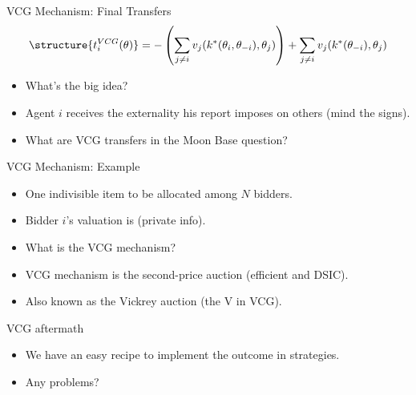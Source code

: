 \documentclass[english,10pt
,aspectratio=169
]{beamer}
\begin{document}
\begin{frame}{VCG Mechanism: Final Transfers}
\begin{align*}
\structure{ t_{i}^{VCG}(\theta) } = -\left(\sum_{j\neq i} v_{j}(k^*(\theta_i, \theta_{-i}), \theta_{j}) \right) + \sum_{j\neq i} v_{j}(k^*(\theta_{-i}), \theta_{j})
\end{align*}
\begin{itemize}
	\item What's the big idea?
	\item Agent $i$ receives the externality his report imposes on others (mind the signs).
	\item What are VCG transfers in the Moon Base question?
\end{itemize}
\end{frame}


\begin{frame}{VCG Mechanism: Example}
\begin{example}[Auction]
	\begin{itemize}
		\item One indivisible item to be allocated among $N$ bidders.
		\item Bidder $i$'s valuation is  (private info).
		\item What is the VCG mechanism?
	\end{itemize}
\end{example}
\begin{itemize}
	\item VCG mechanism is the second-price auction (efficient and DSIC).
	\item Also known as the Vickrey auction (the V in VCG).
\end{itemize}
\end{frame}


\begin{frame}{VCG aftermath}
\begin{itemize}
	\item We have an easy recipe to implement the  outcome in  strategies.
	\item Any problems?
\end{itemize}
\end{frame}
\end{document}
